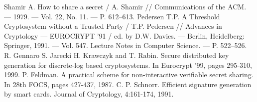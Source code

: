 \begin{thebibliography}{99}

 Shamir A. How to share a secret / A. Shamir // Communications of the ACM. --- 1979. --- Vol. 22, No. 11. --- P. 612--613.
 Pedersen T.P. A Threshold Cryptosystem without a Trusted Party / T.P. Pedersen // Advances in Cryptology --- EUROCRYPT '91 / ed. by D.W. Davies. --- Berlin, Heidelberg: Springer, 1991. --- Vol. 547. Lecture Notes in Computer Science. --- P. 522--526.
 R. Gennaro S. Jarecki H. Krawczyk and T. Rabin. Secure distributed key generation for discrete-log based cryptosystems. In Eurocrypt '99, pages 295-310, 1999.
 P. Feldman. A practical scheme for non-interactive verifiable secret sharing. In 28th FOCS, pages 427-437, 1987.
 C. P. Schnorr. Efficient signature generation by smart cards. Journal of Cryptology, 4:161-174, 1991.  
\end{thebibliography}
